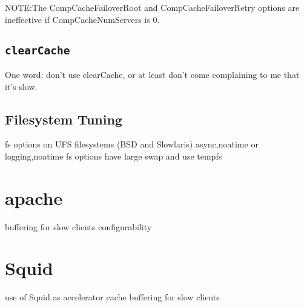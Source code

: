 \documentclass[titlepage]{manual}
\begin{document}
   NOTE:The CompCacheFailoverRoot and CompCacheFailoverRetry options are
   ineffective if CompCacheNumServers is 0.

\subsection{\texttt{clearCache}}
One word: don't use clearCache, or at least don't come complaining to
me that it's slow.

\subsection{Filesystem Tuning}
fs options on UFS filesystems (BSD and Slowlaris) async,noatime or
logging,noatime fs options have large swap and use tempfs
 
\section{apache}
    buffering for slow clients
    configurability

\section{Squid}
  use of Squid as accelerator cache 
    buffering for slow clients


\cleardoublepage %
\printindex
\end{document}
